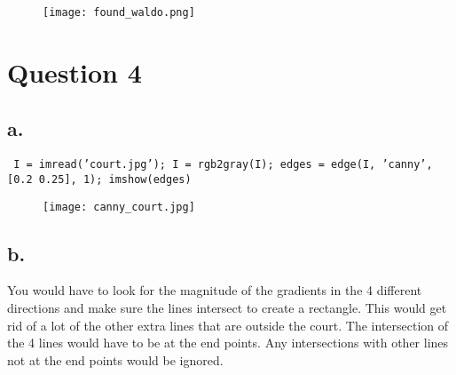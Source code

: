 \documentclass{article}
\begin{document}
\begin{figure}[h!]
\centering
\texttt{[image: found\_waldo.png]}
\label{fig:sample graph}
\end{figure}

\newpage

\section*{Question 4}
\subsection*{a.}
\texttt{\noindent
I = imread('court.jpg');
\newline
I = rgb2gray(I);
\newline
edges = edge(I, 'canny', [0.2 0.25], 1);
\newline
imshow(edges)
}

\begin{figure}[h!]
\centering
\texttt{[image: canny\_court.jpg]}
\label{fig:sample graph}
\end{figure}


\subsection*{b.}

You would have to look for the magnitude of the gradients in the 4 different directions and make sure the lines intersect to create a rectangle. This would get rid of a lot of the other extra lines that are outside the court. The intersection of the 4 lines would have to be at the end points. Any intersections with other lines not at the end points would be ignored.
\end{document}
